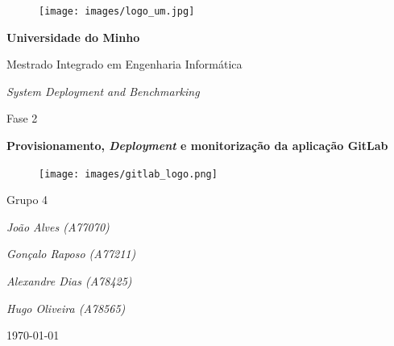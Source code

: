 \documentclass[12pt,a4paper]{article}
\begin{document}
\begin{titlepage}
    \centering
    \begin{figure}[H]
        \centering
        \texttt{[image: images/logo\_um.jpg]}
    \end{figure}
    {\huge\bfseries Universidade do Minho \par}
    \vspace{0.5cm}
    {\large Mestrado Integrado em Engenharia Informática \par}
    \vspace{2cm}
    {\Large \emph{System Deployment and Benchmarking} \par}
    \vspace{2cm}
    {\Large Fase 2 \par}
    \vspace{0.2cm}
    {\Large\bfseries Provisionamento, \emph{Deployment} e monitorização da aplicação GitLab \par}
    \begin{figure}[H]
        \centering
        \texttt{[image: images/gitlab\_logo.png]}
    \end{figure}
    \vspace{2.5cm}
    {\Large Grupo 4 \par}
     \vspace{0.5cm}
    {\Large\itshape João Alves (A77070)\par}
    {\Large\itshape Gonçalo Raposo (A77211)\par}
    {\Large\itshape Alexandre Dias (A78425)\par}
    {\Large\itshape Hugo Oliveira (A78565)\par}
    \vfill
    {\large \today\par}
    \centering
\end{titlepage}




\vspace*{\fill}
\begin{abstract}
O presente documento diz respeito à fase 1 do trabalho prático da unidade curricular \emph{System Deployment} e \emph{Benchmarking}.

Este documento consiste numa análise da aplicação \emph{open source} \textit{GitLab}. Começaremos com uma breve explicação sobre a sua funcionalidade e, posteriormente, será descrita a arquitetura e os diferentes componentes que constituem a aplicação.

Analisar-se-á ainda o ficheiro de configuração do \textit{GitLab} que servirá de complemento aos componentes da arquitetura do \emph{GitLab}.

Por fim serão analisados os componentes críticos e as diferentes implementações da arquitetura do \emph{GitLab} que fazem dele uma aplicação altamente disponível.
\end{abstract}
\vspace*{\fill}
\thispagestyle{empty}
\end{document}
